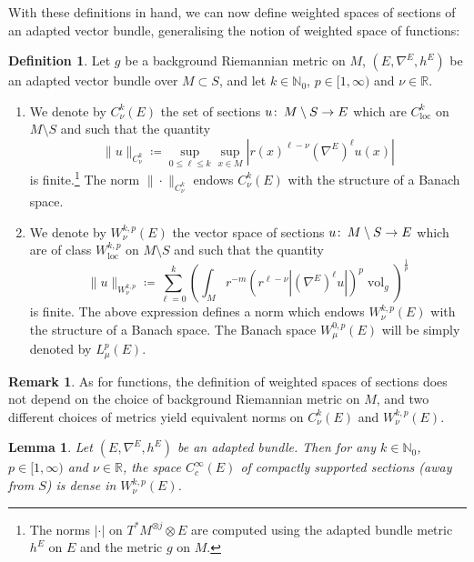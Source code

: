 \documentclass{article}
\numberwithin{equation}{section}        %
\theoremstyle{bfnote}
\newtheorem{lem}[thm]{Lemma}                %
\theoremstyle{definition}
\newtheorem{Def}[thm]{Definition}           %
\theoremstyle{bfremark}
\newtheorem{rem}[thm]{Remark}               %
\newcommand{\col}{\colon \thinspace}        %
\newcommand{\N}{\mathbb{N}}                 %
\newcommand{\R}{\mathbb{R}}                 %
\DeclareMathOperator{\vol}{vol}                 %
\begin{document}
With these definitions in hand, we can now define weighted spaces of sections of an adapted vector bundle, generalising the notion of weighted space of functions:

\begin{Def}     \label{Def: weighted spaces of adapted bundles}
    Let $g$ be a background Riemannian metric on $M$, $(E,\nabla^E,h^E)$ be an adapted vector bundle over $M \subset S$, and let $k \in \N_0$, $p \in [1,\infty)$ and $\nu \in \R$.
    \begin{enumerate}
    	\item We denote by $C^{k}_\nu(E)$ the set of sections $u \col M \setminus S \to E$ which are $C^{k}_{\mathrm{loc}}$ on $M \setminus S$ and such that the quantity
    	\begin{equation*}
        	\|u\|_{C^{k}_\nu} \coloneqq \sup_{0 \leq \ell \leq k} \sup_{x \in M} |r(x)^{\ell-\nu} (\nabla^E)^\ell u(x)|
		\end{equation*}
    	is finite.\footnote{The norms $|\cdot|$ on $T^*M^{\otimes j} \otimes E$ are computed using the adapted bundle metric $h^E$ on $E$ and the metric $g$ on $M$.} The norm $\|\cdot\|_{C^{k}_\nu}$ endows $C^{k}_\nu(E)$ with the structure of a Banach space.
	
		\item We denote by $W^{k,p}_\nu(E)$ the vector space of sections $u \col M \setminus S \rightarrow E$ which are of class $W^{k,p}_{\mathrm{loc}}$ on $M \setminus S$ and such that the quantity
        \begin{equation*}
            \|u\|_{W^{k,p}_\nu} \coloneqq \sum_{\ell = 0}^k \left( \int_M r^{-m} (r^{\ell-\nu} |(\nabla^E)^\ell u|)^p \vol_g \right)^{\frac{1}{p}}
        \end{equation*}
        is finite. The above expression defines a norm which endows $W^{k,p}_\nu(E)$ with the structure of a Banach space. The Banach space $W^{0,p}_\mu(E)$ will be simply denoted by $L^p_\mu(E)$.
    \end{enumerate}
\end{Def}

\begin{rem}
    As for functions, the definition of weighted spaces of sections does not depend on the choice of background Riemannian metric on $M$, and two different choices of metrics yield equivalent norms on $C^k_\nu(E)$ and $W^{k,p}_\nu(E)$.
\end{rem}

\begin{lem}
    Let $(E,\nabla^E,h^E)$ be an adapted bundle. Then for any $k \in \N_0$, $p \in [1,\infty)$ and $\nu \in \R$, the space $C^\infty_c(E)$ of compactly supported sections (away from $S$) is dense in $W^{k,p}_\nu(E)$.
\end{lem}
\end{document}
